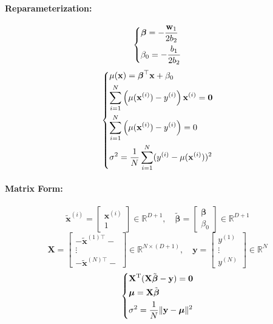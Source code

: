 \documentclass{article}
\begin{document}
\paragraph{Reparameterization:}
\[
    \begin{dcases}
        \boldsymbol{\beta} = -\frac{\mathbf{w}_1}{2b_2} \\
        \beta_0 = -\frac{b_1}{2b_2}
    \end{dcases}
\]
\[
    \begin{dcases}
        \mu(\mathbf{x}) = \boldsymbol{\beta}^\top \mathbf{x} + \beta_0 \\
        \sum_{i=1}^N \left( \mu(\mathbf{x}^{(i)}) - y^{(i)} \right) \mathbf{x}^{(i)} = \mathbf{0} \\
        \sum_{i=1}^N \left( \mu(\mathbf{x}^{(i)}) - y^{(i)} \right) = 0 \\
        \sigma^2 = \frac{1}{N} \sum_{i=1}^N (y^{(i)} - \mu(\mathbf{x}^{(i)}))^2
    \end{dcases}
\]

\paragraph{Matrix Form:}
\[
    \tilde{\mathbf{x}}^{(i)} = \begin{bmatrix} \mathbf{x}^{(i)} \\ 1 \end{bmatrix} \in \mathbb{R}^{D+1}, \quad
    \tilde{\boldsymbol{\beta}} = \begin{bmatrix} \boldsymbol{\beta} \\ \beta_0 \end{bmatrix} \in \mathbb{R}^{D+1}
\]
\[
    \mathbf{X} =
    \begin{bmatrix}
        - \tilde{\mathbf{x}}^{(1)\top} - \\
        \vdots \\
        - \tilde{\mathbf{x}}^{(N)\top} -
    \end{bmatrix} \in \mathbb{R}^{N \times (D+1)}, \quad
    \mathbf{y} =
    \begin{bmatrix}
        y^{(1)} \\
        \vdots \\
        y^{(N)}
    \end{bmatrix} \in \mathbb{R}^N
\]
\[
    \begin{dcases}
        \mathbf{X}^{\mathrm{T}} (\mathbf{X} \tilde{\boldsymbol{\beta}} - \mathbf{y}) = \mathbf{0} \\
        \boldsymbol{\mu} = \mathbf{X} \tilde{\boldsymbol{\beta}} \\
        \sigma^2 = \frac{1}{N} \|\mathbf{y} - \boldsymbol{\mu}\|^2
    \end{dcases}
\]
\end{document}
